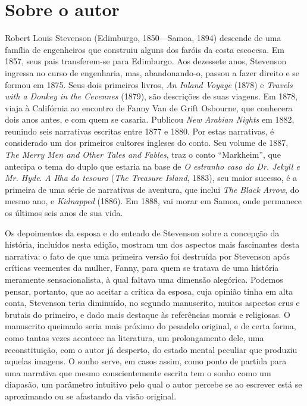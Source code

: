 
\section{Sobre o autor}

Robert Louis Stevenson (Edimburgo, 1850---Samoa, 1894) 
descende de uma família de engenheiros que construiu alguns dos 
faróis da costa escocesa. Em 1857, seus pais transferem-se para 
Edimburgo. Aos dezessete anos, Stevenson ingressa no curso de 
engenharia, mas, abandonando-o, passou a fazer direito e se formou em 1875. 
Seus dois primeiros livros, \textit{An Inland Voyage} (1878) e \textit{Travels with a Donkey in the Cevennes} (1879), são descrições de suas viagens. Em 1878, viaja 
à Califórnia ao encontro de Fanny Van de Grift Osbourne, que 
conhecera dois anos antes, e com quem se casaria. Publicou \textit{New 
Arabian Nights} em 1882, reunindo seis narrativas escritas 
entre 1877 e 1880. Por estas narrativas, é considerado um dos 
primeiros cultores ingleses do conto. Seu volume de 1887, 
\textit{The Merry Men and Other Tales and Fables}, traz o conto ``Markheim'', 
que antecipa o tema do duplo que estaria na base de \textit{O estranho caso 
do Dr. Jekyll e Mr. Hyde}. \textit{A Ilha do tesouro} (\textit{The Treasure Island}, 1883), seu maior sucesso, é a primeira de uma série de narrativas 
de aventura, que inclui \textit{The Black Arrow}, do mesmo ano, e \textit{Kidnapped} (1886). Em 1888, vai morar em Samoa, onde permanece os últimos seis anos de sua vida.


Os depoimentos da esposa e do enteado de Stevenson sobre a concepção da
história, incluídos nesta edição, mostram um dos aspectos mais
fascinantes desta narrativa: o fato de que uma primeira versão foi
destruída por Stevenson após críticas veementes da mulher, Fanny, para
quem se tratava de uma história meramente sensacionalista, à qual
faltava uma dimensão alegórica.  Podemos pensar, portanto, que ao
aceitar a crítica da esposa, cuja opinião tinha em alta conta,
Stevenson teria diminuído, no segundo manuscrito, muitos aspectos crus
e brutais do primeiro, e dado mais destaque às referências morais e
religiosas.  O manuscrito queimado seria mais próximo do pesadelo
original, e de certa forma, como tantas vezes acontece na literatura,
um prolongamento dele, uma reconstituição, com o autor já desperto, do
estado mental peculiar que produziu aquelas imagens.  O sonho serve, em
casos assim, como ponto de partida para uma narrativa que mesmo
conscientemente escrita tem o sonho como um diapasão, um parâmetro
intuitivo pelo qual o autor percebe se ao escrever está se aproximando
ou se afastando da visão original.

